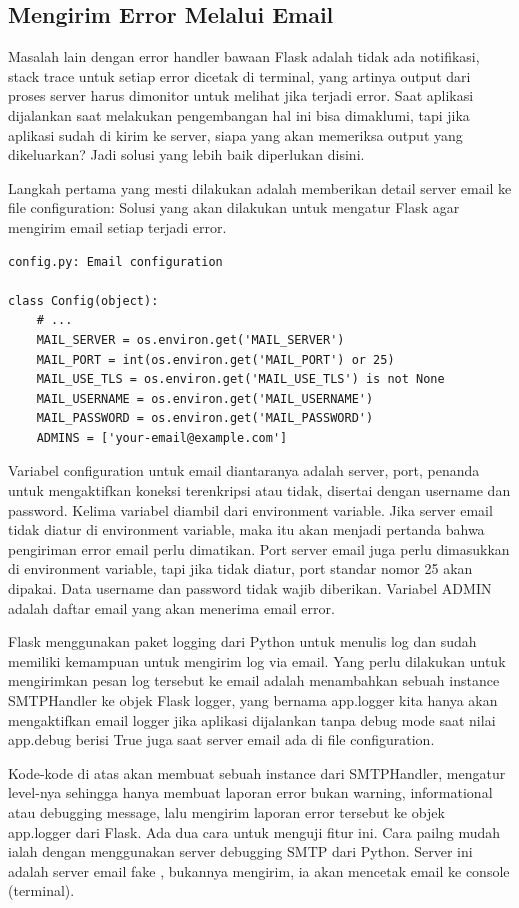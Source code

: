 \subsection{Mengirim Error Melalui Email}
Masalah lain dengan error handler bawaan Flask adalah tidak ada notifikasi, stack trace untuk setiap error dicetak di terminal, yang artinya output dari proses server harus dimonitor untuk melihat jika terjadi error. Saat aplikasi dijalankan saat melakukan pengembangan hal ini bisa dimaklumi, tapi jika aplikasi sudah di kirim ke server, siapa yang akan memeriksa output yang dikeluarkan? Jadi solusi yang lebih baik diperlukan disini.

Langkah pertama yang mesti dilakukan adalah memberikan detail server email ke file configuration:
Solusi yang akan dilakukan untuk mengatur Flask agar mengirim email setiap terjadi error.
\begin{verbatim}
config.py: Email configuration

class Config(object):
    # ...
    MAIL_SERVER = os.environ.get('MAIL_SERVER')
    MAIL_PORT = int(os.environ.get('MAIL_PORT') or 25)
    MAIL_USE_TLS = os.environ.get('MAIL_USE_TLS') is not None
    MAIL_USERNAME = os.environ.get('MAIL_USERNAME')
    MAIL_PASSWORD = os.environ.get('MAIL_PASSWORD')
    ADMINS = ['your-email@example.com']
    \end{verbatim} 
    
Variabel configuration untuk email diantaranya adalah server, port, penanda untuk mengaktifkan koneksi terenkripsi atau tidak, disertai dengan username dan password. Kelima variabel diambil dari environment variable. Jika server email tidak diatur di environment variable, maka itu akan menjadi pertanda bahwa pengiriman error email perlu dimatikan. Port server email juga perlu dimasukkan di environment variable, tapi jika tidak diatur, port standar nomor 25 akan dipakai. Data username dan password tidak wajib diberikan. Variabel ADMIN adalah daftar email yang akan menerima email error.

Flask menggunakan paket logging dari Python untuk menulis log dan  sudah memiliki kemampuan untuk mengirim log via email. Yang perlu dilakukan untuk mengirimkan pesan log tersebut ke email adalah menambahkan sebuah instance SMTPHandler ke objek Flask logger, yang bernama app.logger  kita hanya akan mengaktifkan email logger jika aplikasi dijalankan tanpa debug mode saat nilai app.debug berisi True juga saat server email ada di file configuration.

Kode-kode di atas akan membuat sebuah instance dari SMTPHandler, mengatur level-nya sehingga hanya membuat laporan error bukan warning, informational atau debugging message, lalu mengirim laporan error tersebut ke objek app.logger dari Flask. Ada dua cara untuk menguji fitur ini. Cara pailng mudah ialah dengan menggunakan server debugging SMTP dari Python. Server ini adalah server email fake , bukannya mengirim, ia akan mencetak email ke console (terminal). 

